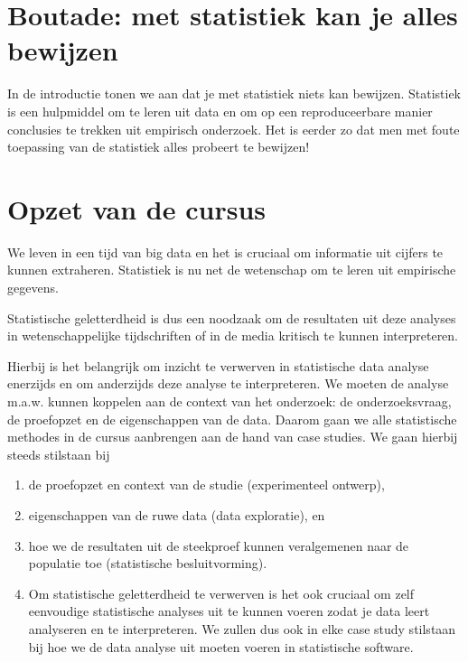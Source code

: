 \documentclass[
  12pt,dutch,coursenotes]{book}
\theoremstyle{definition}
\theoremstyle{definition}
\theoremstyle{definition}
\theoremstyle{remark}
\begin{document}
\hypertarget{boutade-met-statistiek-kan-je-alles-bewijzen}{%
\section{Boutade: met statistiek kan je alles bewijzen}\label{boutade-met-statistiek-kan-je-alles-bewijzen}}

In de introductie tonen we aan dat je met statistiek niets kan bewijzen. Statistiek is een hulpmiddel om te leren uit data en om op een reproduceerbare manier conclusies te trekken uit empirisch onderzoek.
Het is eerder zo dat men met foute toepassing van de statistiek alles probeert te bewijzen!

\hypertarget{opzet-van-de-cursus}{%
\section{Opzet van de cursus}\label{opzet-van-de-cursus}}

We leven in een tijd van big data en het is cruciaal om informatie uit cijfers te kunnen extraheren. Statistiek is nu net de wetenschap om te leren uit empirische gegevens.

Statistische geletterdheid is dus een noodzaak om de resultaten uit deze analyses in wetenschappelijke tijdschriften of in de media kritisch te kunnen interpreteren.

Hierbij is het belangrijk om inzicht te verwerven in statistische data analyse enerzijds en om anderzijds deze analyse te interpreteren. We moeten de analyse m.a.w. kunnen koppelen aan de context van het onderzoek: de onderzoeksvraag, de proefopzet en de eigenschappen van de data.
Daarom gaan we alle statistische methodes in de cursus aanbrengen aan de hand van case studies.
We gaan hierbij steeds stilstaan bij

\begin{enumerate}
\def\labelenumi{\arabic{enumi}.}
\item
  de proefopzet en context van de studie (experimenteel ontwerp),
\item
  eigenschappen van de ruwe data (data exploratie), en
\item
  hoe we de resultaten uit de steekproef kunnen veralgemenen naar de populatie toe (statistische besluitvorming).
\item
  Om statistische geletterdheid te verwerven is het ook cruciaal om zelf eenvoudige statistische analyses uit te kunnen voeren zodat je data leert analyseren en te interpreteren. We zullen dus ook in elke case study stilstaan bij hoe we de data analyse uit moeten voeren in statistische software.
\end{enumerate}
\end{document}
